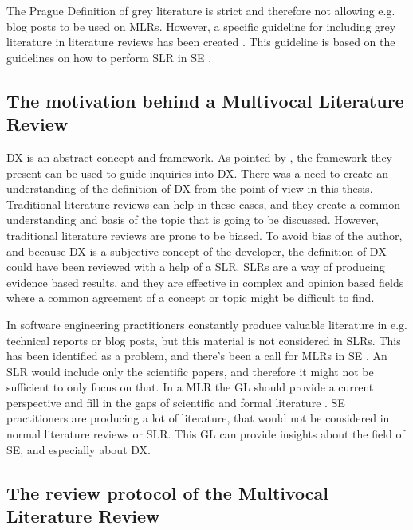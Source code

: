 \documentclass[english, 12pt, a4paper, sci, utf8, a-1b, online]{aaltothesis}
\begin{document}
The Prague Definition of grey literature is strict and therefore not allowing e.g. blog posts to be used on MLRs. However, a specific guideline for including grey literature in literature reviews has been created \parencite{guidelines-for-MLR}. This guideline is based on the guidelines on how to perform SLR in SE \parencite{guidelines-for-SLR-in-SE}.

\subsection{The motivation behind a Multivocal Literature Review}

DX is an abstract concept and framework. As pointed by \textcite{fagerholm-doctoral-thesis}, the framework they present can be used to guide inquiries into DX. There was a need to create an understanding of the definition of DX from the point of view in this thesis. Traditional literature reviews can help in these cases, and they create a common understanding and basis of the topic that is going to be discussed. However, traditional literature reviews are prone to be biased. To avoid bias of the author, and because DX is a subjective concept of the developer, the definition of DX could have been reviewed with a help of a SLR. SLRs are a way of producing evidence based results, and they are effective in complex and opinion based fields where a common agreement of a concept or topic might be difficult to find.

In software engineering practitioners constantly produce valuable literature in e.g. technical reports or blog posts, but this material is not considered in SLRs. This has been identified as a problem, and there's been a call for MLRs in SE \parencite{the-need-for-MLR}. An SLR would include only the scientific papers, and therefore it might not be sufficient to only focus on that. In a MLR the GL should provide a current perspective and fill in the gaps of scientific and formal literature \parencite{guidelines-for-MLR}. SE practitioners are producing a lot of literature, that would not be considered in normal literature reviews or SLR. This GL can provide insights about the field of SE, and especially about DX.


\subsection{The review protocol of the Multivocal Literature Review}
\end{document}
